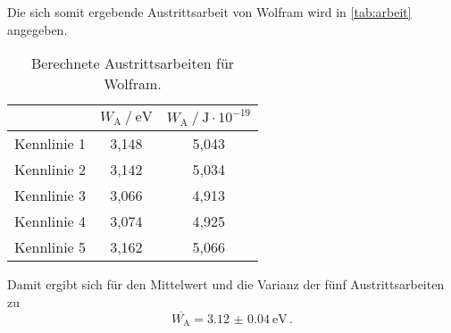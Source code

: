 Die sich somit ergebende Austrittsarbeit von Wolfram wird in \autoref{tab:arbeit} angegeben.
\begin{table}
  \centering
  \caption{Berechnete Austrittsarbeiten für Wolfram.}
  \label{tab:arbeit}
  \begin{tabular}{c c c}
    \toprule
                &  $W_{\text{A}} \mathbin{/} \mathrm{eV}$ &
                   $W_{\text{A}} \mathbin{/} \mathrm{J} \cdot 10^{-19}$ \\
    \midrule
    Kennlinie 1 &  3,148 & 5,043 \\
    Kennlinie 2 &  3,142 & 5,034 \\
    Kennlinie 3 &  3,066 & 4,913 \\
    Kennlinie 4 &  3,074 & 4,925 \\
    Kennlinie 5 &  3,162 & 5,066 \\
    \bottomrule
    \end{tabular}
\end{table}

Damit ergibt sich für den Mittelwert und die Varianz der fünf Austrittsarbeiten zu
\begin{equation*}
  \overline{W_{\text{A}}} = \qty{3.12(4)}{\eV} \, .
\end{equation*}

